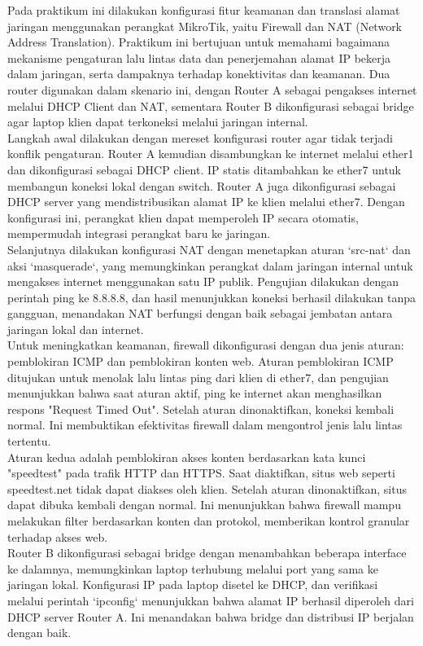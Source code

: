 Pada praktikum ini dilakukan konfigurasi fitur keamanan dan translasi alamat jaringan menggunakan perangkat MikroTik, yaitu Firewall dan NAT (Network Address Translation). Praktikum ini bertujuan untuk memahami bagaimana mekanisme pengaturan lalu lintas data dan penerjemahan alamat IP bekerja dalam jaringan, serta dampaknya terhadap konektivitas dan keamanan. Dua router digunakan dalam skenario ini, dengan Router A sebagai pengakses internet melalui DHCP Client dan NAT, sementara Router B dikonfigurasi sebagai bridge agar laptop klien dapat terkoneksi melalui jaringan internal.
\\
Langkah awal dilakukan dengan mereset konfigurasi router agar tidak terjadi konflik pengaturan. Router A kemudian disambungkan ke internet melalui ether1 dan dikonfigurasi sebagai DHCP client. IP statis ditambahkan ke ether7 untuk membangun koneksi lokal dengan switch. Router A juga dikonfigurasi sebagai DHCP server yang mendistribusikan alamat IP ke klien melalui ether7. Dengan konfigurasi ini, perangkat klien dapat memperoleh IP secara otomatis, mempermudah integrasi perangkat baru ke jaringan.
\\
Selanjutnya dilakukan konfigurasi NAT dengan menetapkan aturan `src-nat` dan aksi `masquerade`, yang memungkinkan perangkat dalam jaringan internal untuk mengakses internet menggunakan satu IP publik. Pengujian dilakukan dengan perintah ping ke 8.8.8.8, dan hasil menunjukkan koneksi berhasil dilakukan tanpa gangguan, menandakan NAT berfungsi dengan baik sebagai jembatan antara jaringan lokal dan internet.
\\
Untuk meningkatkan keamanan, firewall dikonfigurasi dengan dua jenis aturan: pemblokiran ICMP dan pemblokiran konten web. Aturan pemblokiran ICMP ditujukan untuk menolak lalu lintas ping dari klien di ether7, dan pengujian menunjukkan bahwa saat aturan aktif, ping ke internet akan menghasilkan respons "Request Timed Out". Setelah aturan dinonaktifkan, koneksi kembali normal. Ini membuktikan efektivitas firewall dalam mengontrol jenis lalu lintas tertentu.
\\
Aturan kedua adalah pemblokiran akses konten berdasarkan kata kunci "speedtest" pada trafik HTTP dan HTTPS. Saat diaktifkan, situs web seperti speedtest.net tidak dapat diakses oleh klien. Setelah aturan dinonaktifkan, situs dapat dibuka kembali dengan normal. Ini menunjukkan bahwa firewall mampu melakukan filter berdasarkan konten dan protokol, memberikan kontrol granular terhadap akses web.
\\
Router B dikonfigurasi sebagai bridge dengan menambahkan beberapa interface ke dalamnya, memungkinkan laptop terhubung melalui port yang sama ke jaringan lokal. Konfigurasi IP pada laptop disetel ke DHCP, dan verifikasi melalui perintah `ipconfig` menunjukkan bahwa alamat IP berhasil diperoleh dari DHCP server Router A. Ini menandakan bahwa bridge dan distribusi IP berjalan dengan baik.


